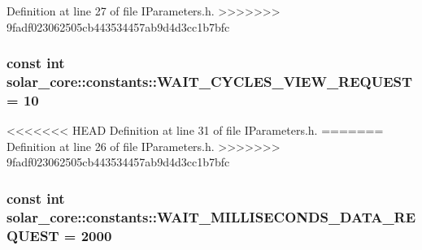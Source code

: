Definition at line 27 of file I\+Parameters.\+h.
>>>>>>> 9fadf023062505cb443534457ab9d4d3cc1b7bfc

\hypertarget{namespacesolar__core_1_1constants_ae4d0a481c94f57be3e97f1c8463e631a}{}
\subsubsection[{W\+A\+I\+T\+\_\+\+C\+Y\+C\+L\+E\+S\+\_\+\+V\+I\+E\+W\+\_\+\+R\+E\+Q\+U\+E\+S\+T}]{\setlength{\rightskip}{0pt plus 5cm}const int solar\+\_\+core\+::constants\+::\+W\+A\+I\+T\+\_\+\+C\+Y\+C\+L\+E\+S\+\_\+\+V\+I\+E\+W\+\_\+\+R\+E\+Q\+U\+E\+S\+T = 10}\label{namespacesolar__core_1_1constants_ae4d0a481c94f57be3e97f1c8463e631a}


<<<<<<< HEAD
Definition at line 31 of file I\+Parameters.\+h.
=======
Definition at line 26 of file I\+Parameters.\+h.
>>>>>>> 9fadf023062505cb443534457ab9d4d3cc1b7bfc

\hypertarget{namespacesolar__core_1_1constants_a88d556c323e6871de3313428289b6cb6}{}
\subsubsection[{W\+A\+I\+T\+\_\+\+M\+I\+L\+L\+I\+S\+E\+C\+O\+N\+D\+S\+\_\+\+D\+A\+T\+A\+\_\+\+R\+E\+Q\+U\+E\+S\+T}]{\setlength{\rightskip}{0pt plus 5cm}const int solar\+\_\+core\+::constants\+::\+W\+A\+I\+T\+\_\+\+M\+I\+L\+L\+I\+S\+E\+C\+O\+N\+D\+S\+\_\+\+D\+A\+T\+A\+\_\+\+R\+E\+Q\+U\+E\+S\+T = 2000}\label{namespacesolar__core_1_1constants_a88d556c323e6871de3313428289b6cb6}


